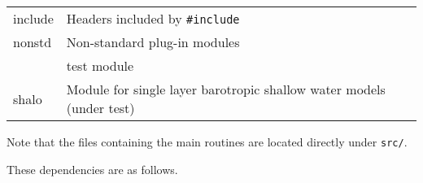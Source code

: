 \begin{longtable}[]{@{}ll@{}}
\begin{minipage}[t]{0.47\columnwidth}\raggedright
include\strut
\end{minipage} & \begin{minipage}[t]{0.47\columnwidth}\raggedright
Headers included by {\texttt{\#include}}\strut
\end{minipage}\tabularnewline
\begin{minipage}[t]{0.47\columnwidth}\raggedright
nonstd\strut
\end{minipage} & \begin{minipage}[t]{0.47\columnwidth}\raggedright
Non-standard plug-in modules\strut
\end{minipage}\tabularnewline
\begin{minipage}[t]{0.47\columnwidth}\raggedright
\strut
\end{minipage} & \begin{minipage}[t]{0.47\columnwidth}\raggedright
test module\strut
\end{minipage}\tabularnewline
\begin{minipage}[t]{0.47\columnwidth}\raggedright
shalo\strut
\end{minipage} & \begin{minipage}[t]{0.47\columnwidth}\raggedright
Module for single layer barotropic shallow water models (under
test)\strut
\end{minipage}\tabularnewline
\bottomrule
\end{longtable}

Note that the files containing the main routines are located directly
under {\texttt{src/}}.

These dependencies are as follows.

